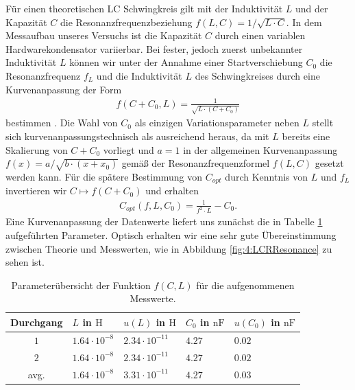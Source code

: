 \documentclass[../../main.tex]{subfiles}
\begin{document}
        Für einen theoretischen LC Schwingkreis gilt mit der Induktivität $L$ und der Kapazität $C$ die Resonanzfrequenzbeziehung $f(L,C) = 1/\sqrt{L\cdot C}$. In dem Messaufbau unseres Versuchs ist die Kapazität $C$ durch einen variablen Hardwarekondensator variierbar. Bei fester, jedoch zuerst unbekannter Induktivität $L$ können wir unter der Annahme einer Startverschiebung $C_0$ die Resonanzfrequenz $f_L$ und die Induktivität $L$ des Schwingkreises durch eine Kurvenanpassung der Form 
        \begin{align}
            f(C + C_0,L) = \frac{1}{\sqrt{L\cdot (C + C_0)}}
        \end{align}
        bestimmen \cite[ch 1.4.3]{doc:EFNMRStudentManual}. Die Wahl von $C_0$ als einzigen Variationsparameter neben $L$ stellt sich kurvenanpassungstechnisch als ausreichend heraus, da mit $L$ bereits eine Skalierung von $C + C_0$ vorliegt und $a=1$ in der allgemeinen Kurvenanpassung $f(x) = a / \sqrt{b\cdot (x + x_0)}$ gemäß der Resonanzfrequenzformel $f(L,C)$ gesetzt werden kann.
        Für die spätere Bestimmung von $C_{opt}$ durch Kenntnis von $L$ und $f_L$ invertieren wir $C\mapsto f(C + C_0)$ und erhalten 
        \begin{align}
            C_{opt}(f,L,C_0) = \frac{1}{f^2\cdot L} - C_0. \label{eq:4:Capacitance}
        \end{align}
        Eine Kurvenanpassung der Datenwerte liefert uns zunächst die in Tabelle \ref{tab:4:LCRResonance} aufgeführten Parameter. Optisch erhalten wir eine sehr gute Übereinstimmung zwischen Theorie und Messwerten, wie in Abbildung \ref{fig:4:LCRResonance} zu sehen ist.
        \begin{table}[H]
            \centering
            \begin{tabular}{c|ll|ll}
                 \textbf{Durchgang} & $L$ in $\si{\henry}$ & $u(L)$ in $\si{\henry}$ & $C_0$ in $\si{\nano\farad}$ & $u(C_0)$ in $\si{\nano\farad}$ \\
                \hline
                $1$ & $1.64\cdot 10^{-8}$ & $2.34\cdot 10^{-11}$ & $4.27$ & $0.02$ \\
                $2$ & $1.64\cdot 10^{-8}$ & $2.34\cdot 10^{-11}$ & $4.27$ & $0.02$ \\
                \hline
                avg. & $1.64\cdot 10^{-8}$ & $3.31\cdot 10^{-11}$ & $4.27$ & $0.03$
            \end{tabular} 
            \caption{Parameterübersicht der Funktion $f(C,L)$ für die aufgenommenen Messwerte.}
            \label{tab:4:LCRResonance}
        \end{table}
\end{document}
